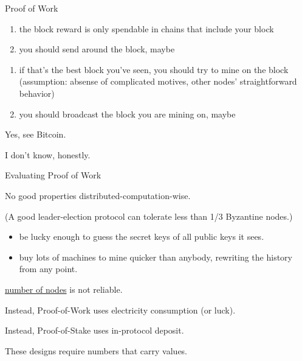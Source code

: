 \documentclass{beamer}
\begin{document}
\begin{frame}{Proof of Work}

\begin{enumerate}
\item the block reward is only spendable in chains that include your block
\item you should send around the block, maybe
\end{enumerate}

\begin{enumerate}
\item if that's the best block you've seen, you should try to mine on the block \\
      (assumption: absense of complicated motives, other nodes' straightforward behavior)
\item you should broadcast the block you are mining on, maybe
\end{enumerate}

  Yes, see Bitcoin.

  I don't know, honestly.
\end{frame}

\begin{frame}{Evaluating Proof of Work}

No good properties distributed-computation-wise.

(A good leader-election protocol can tolerate less than 1/3 Byzantine nodes.)

\begin{itemize}
\item be lucky enough to guess the secret keys of all public keys it sees.
\end{itemize}

\begin{itemize}
\item buy lots of machines to mine quicker than anybody, rewriting the history from any point.
\end{itemize}

 \underline{number of nodes} is not reliable.

Instead, Proof-of-Work uses electricity consumption (or luck).

Instead, Proof-of-Stake uses in-protocol deposit.

These designs require numbers that carry values.

\end{frame}
\end{document}
